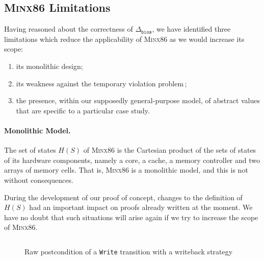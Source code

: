 \subsection{{\scshape Minx86} Limitations}
\label{subsec:freespec:minx86lim}

Having reasoned about the correctness of \( \Delta_{\mathtt{bios}} \), we have
identified three limitations which reduce the applicability of {\scshape Minx86}
as we would increase its scope:
\begin{enumerate}
\item its monolithic design;
\item  its weakness against the temporary violation problem\,\cite{muller2006tempviolation};
\item the presence, within our supposedly general-purpose model, of abstract values that are specific to a particular case study.
\end{enumerate}

\paragraph{Monolithic Model.}
%
The set of states \( H(S) \) of {\scshape Minx86} is the Cartesian product of
the sets of states of its hardware components, namely a core, a cache, a memory
controller and two arrays of memory cells.
%
That is, {\scshape Minx86} is a monolithic model, and this is not without
consequences.

During the development of our proof of concept, changes to the definition of
\( H(S) \) had an important impact on proofs already written at the moment.
%
We have no doubt that such situations will arise again if we try to increase the
scope of {\scshape Minx86}.

\begin{figure}
  \inputminted{coq}{Listings/StateHell.v}

  \caption{Raw postcondition of a \texttt{Write} transition with a writeback
    strategy}
  \label{fig:freespec:entrypoint}
\end{figure}

